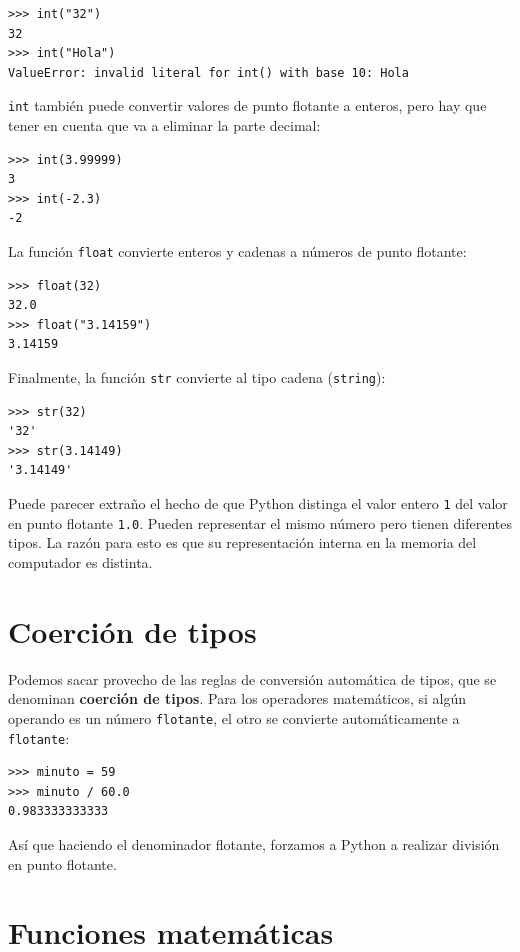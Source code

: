 \begin{verbatim}
>>> int("32")
32
>>> int("Hola")
ValueError: invalid literal for int() with base 10: Hola
\end{verbatim}
 \texttt{int} también puede convertir valores de punto flotante a
enteros, pero hay que tener en cuenta que va a eliminar la parte decimal:

\begin{verbatim}
>>> int(3.99999)
3
>>> int(-2.3)
-2
\end{verbatim}
 La función \texttt{float} convierte enteros y cadenas a números de
punto flotante:

\begin{verbatim}
>>> float(32)
32.0
>>> float("3.14159")
3.14159
\end{verbatim}
 Finalmente, la función \texttt{str} convierte al tipo cadena (\texttt{string}):

\begin{verbatim}
>>> str(32)
'32'
>>> str(3.14149)
'3.14149'
\end{verbatim}
 Puede parecer extraño el hecho de que Python distinga el valor entero
\texttt{1} del valor en punto flotante \texttt{1.0}. Pueden representar
el mismo número pero tienen diferentes tipos. La razón para esto es
que su representación interna en la memoria del computador es distinta.

\section{Coerción de tipos}

  

Podemos sacar provecho de las reglas de conversión automática de tipos,
que se denominan \textbf{coerción de tipos}. Para los operadores matemáticos,
si algún operando es un número \texttt{flotante}, el otro se convierte
automáticamente a \texttt{flotante}:

\begin{verbatim}
>>> minuto = 59
>>> minuto / 60.0
0.983333333333
\end{verbatim}

Así que haciendo el denominador flotante, forzamos a Python a realizar
división en punto flotante.

\section{Funciones matemáticas}


